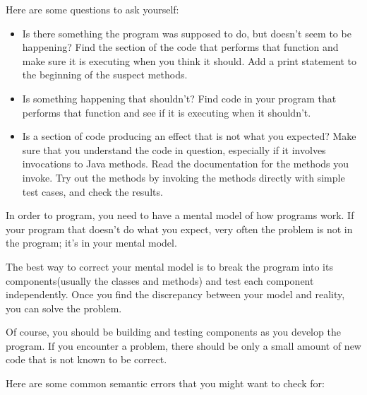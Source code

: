 \documentclass{book}
\begin{document}
Here are some questions to ask yourself:

\begin{itemize}

\item Is there something the program was supposed to do, but
doesn't seem to be happening?  Find the section of the code
that performs that function and make sure it is executing when
you think it should.  Add a print statement to the beginning
of the suspect methods.

\item Is something happening that shouldn't?  Find code in
your program that performs that function and see if it is
executing when it shouldn't.

\item Is a section of code producing an effect that is not
what you expected?  Make sure that you understand the code in
question, especially if it involves invocations to 
Java methods.  Read the documentation for the methods you invoke.
Try out the methods by invoking the methods directly with
simple test cases, and check the results.

\end{itemize}

In order to program, you need to have a mental model of how
programs work.  If your program that doesn't do what you expect,
very often the problem is not in the program; it's in your mental
model.


The best way to correct your mental model is to break the program
into its components(usually the classes and methods) and test
each component independently.  Once you find the discrepancy
between your model and reality, you can solve the problem.

Of course, you should be building and testing components as you
develop the program.  If you encounter a problem, there should be only
a small amount of new code that is not known to be correct.

Here are some common semantic errors that you might want to check for:
\end{document}

